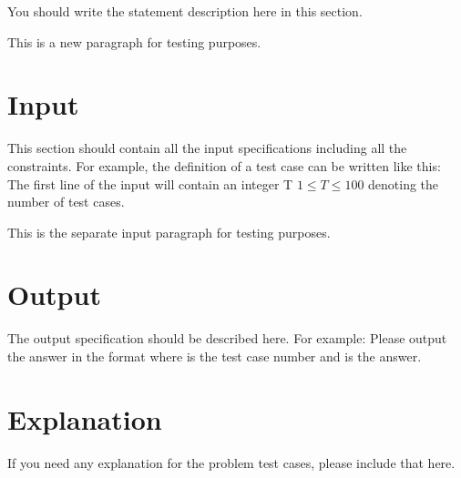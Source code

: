 You should write the statement description here in this section.

This is a new paragraph for testing purposes.

\section*{Input}

This section should contain all the input specifications including all the
constraints. For example, the definition of a test case can be written like
this: The first line of the input will contain an integer T $1 \le T \le 100$
denoting the number of test cases.

This is the separate input paragraph for testing purposes.

\section*{Output}

The output specification should be described here. For example: Please
output the answer in the format  where  is the test case
number and  is the answer.

\section*{Explanation}
If you need any explanation for the problem test cases, please include
that here.